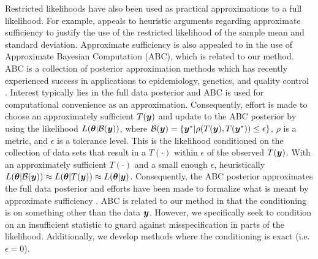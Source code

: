 \documentclass[ba]{imsart}
\def\bth{\mbox{\boldmath $\theta$}}
\newcommand{\by}{\mbox{\boldmath $y$}}
\newcommand{\bz}{\mbox{\boldmath $z$}}
\begin{document}
Restricted likelihoods have also been used as practical approximations to a full likelihood. For example, \cite{pratt1965} appeals to heuristic arguments regarding approximate sufficiency to justify the use of the restricted likelihood of the sample mean and standard deviation. Approximate sufficiency is also appealed to in the use of Approximate Bayesian Computation (ABC), which is related to our method.  
ABC is a collection of posterior approximation methods which has recently experienced success in applications to epidemiology, genetics, and quality control \citep[see, for example,][]{tavare1997, pritchard1999,  marjoram2003, fearnhead2012}. Interest typically lies in the full data posterior and ABC is used for computational convenience as an approximation.  Consequently, effort is made to choose an approximately sufficient $T(\by)$ and update to the ABC posterior by using the likelihood $L(\bth| \mathcal{B}(\by))$, where $\mathcal{B}(\by)=\{\by^{*}|\rho(T(\by),T(\by^{*})) \leq \epsilon\}$, $\rho$ is a metric, and $\epsilon$ is a tolerance level. This is the likelihood conditioned on the collection of data sets that result in a $T(\cdot)$ within $\epsilon$ of the observed $T(\by)$. %
With an approximately sufficient $T(\cdot)$ and a small enough $\epsilon$, heuristically  $L(\bth|\mathcal{B}(\by))\approx L(\bth|T(\by))\approx L(\bth|\by)$. Consequently, the ABC posterior approximates the full data posterior and efforts have been made to formalize what is meant by  approximate sufficiency \citep[e.g.,][]{joyce2008}. ABC is related to our method in that the conditioning is on something other than the data $\by$.  However, we specifically seek to condition on an insufficient statistic to guard against misspecification in parts of the likelihood. Additionally, we develop methods where the conditioning is exact (i.e. $\epsilon = 0$).


\end{document}
